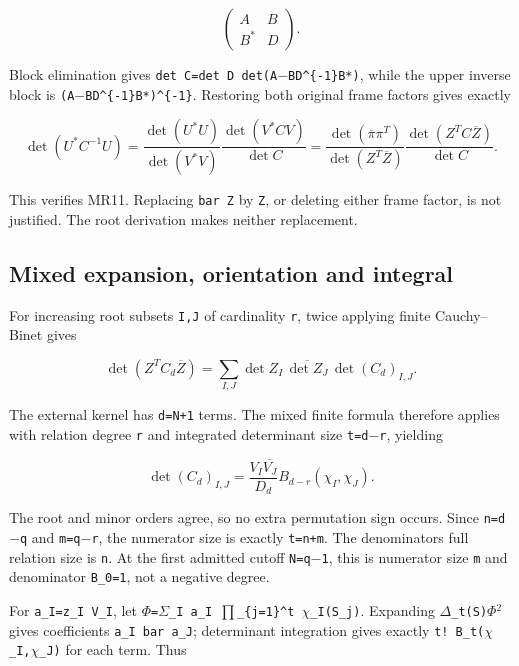 \documentclass[11pt]{article}
\begin{document}
\[
\begin{pmatrix}A&B\\B^*&D\end{pmatrix}.
\]

Block elimination gives \texttt{det\ C=det\ D\ det(A\ensuremath{-}BD\^{}\{-1\}B*)}, while the upper inverse block is \texttt{(A\ensuremath{-}BD\^{}\{-1\}B*)\^{}\{-1\}}. Restoring both original frame factors gives exactly

\[
\det(U^*C^{-1}U)
=\frac{\det(U^*U)}{\det(V^*V)}
  \frac{\det(V^*CV)}{\det C}
=\frac{\det(\overline\pi\pi^T)}{\det(Z^T\overline Z)}
  \frac{\det(Z^TC\overline Z)}{\det C}.
\]

This verifies MR11. Replacing \texttt{bar\ Z} by \texttt{Z}, or deleting either frame factor, is not justified. The root derivation makes neither replacement.

\subsection{Mixed expansion, orientation and integral}\label{mrreview:mixed-expansion-orientation-and-integral}

For increasing root subsets \texttt{I,J} of cardinality \texttt{r}, twice applying finite Cauchy--Binet gives

\[
\det(Z^TC_d\overline Z)
=\sum_{I,J}\det Z_I\,\overline{\det Z_J}\,
  \det(C_d)_{I,J}.
\]

The external kernel has \texttt{d=N+1} terms. The mixed finite formula therefore applies with relation degree \texttt{r} and integrated determinant size \texttt{t=d\ensuremath{-}r}, yielding

\[
\det(C_d)_{I,J}
=\frac{V_I\overline{V_J}}{D_d}
 B_{d-r}(\chi_I,\chi_J).
\]

The root and minor orders agree, so no extra permutation sign occurs. Since \texttt{n=d\ensuremath{-}q} and \texttt{m=q\ensuremath{-}r}, the numerator size is exactly \texttt{t=n+m}. The denominator\textquotesingle s full relation size is \texttt{n}. At the first admitted cutoff \texttt{N=q\ensuremath{-}1}, this is numerator size \texttt{m} and denominator \texttt{B\_0=1}, not a negative degree.

For \texttt{a\_I=z\_I\ V\_I}, let \texttt{\ensuremath{\Phi}=\ensuremath{\Sigma}\_I\ a\_I\ \ensuremath{\prod}\_\{j=1\}\^{}t\ \ensuremath{\chi}\_I(S\_j)}. Expanding \texttt{\textbar{}\ensuremath{\Delta}\_t(S)\ensuremath{\Phi}\textbar{}\ensuremath{{}^2}} gives coefficients \texttt{a\_I\ bar\ a\_J}; determinant integration gives exactly \texttt{t!\ B\_t(\ensuremath{\chi}\_I,\ensuremath{\chi}\_J)} for each term. Thus
\end{document}
